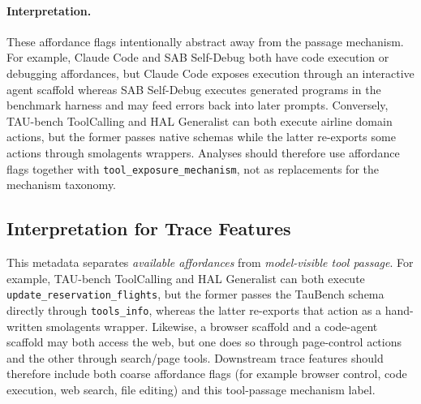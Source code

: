 \paragraph{Interpretation.}
These affordance flags intentionally abstract away from the passage mechanism.
For example, Claude Code and SAB Self-Debug both have code execution or
debugging affordances, but Claude Code exposes execution through an interactive
agent scaffold whereas SAB Self-Debug executes generated programs in the
benchmark harness and may feed errors back into later prompts. Conversely,
TAU-bench ToolCalling and HAL Generalist can both execute airline domain
actions, but the former passes native schemas while the latter re-exports some
actions through smolagents wrappers. Analyses should therefore use affordance
flags together with \texttt{tool\_exposure\_mechanism}, not as replacements for
the mechanism taxonomy.

\subsection{Interpretation for Trace Features}

This metadata separates \emph{available affordances} from \emph{model-visible
tool passage}. For example, TAU-bench ToolCalling and HAL Generalist can both
execute \texttt{update\_reservation\_flights}, but the former passes the
TauBench schema directly through \texttt{tools\_info}, whereas the latter
re-exports that action as a hand-written smolagents wrapper. Likewise, a
browser scaffold and a code-agent scaffold may both access the web, but one
does so through page-control actions and the other through search/page tools.
Downstream trace features should therefore include both coarse affordance flags
(for example browser control, code execution, web search, file editing) and this
tool-passage mechanism label.
